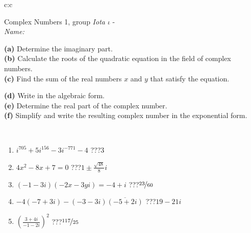 \documentclass[10pt]{report}
\begin{document}
\begin{tabular}{c:c}
\begin{minipage}[c][104.5mm][t]{0.5\linewidth}
\begin{center}
\vspace{5mm}
{\huge Complex Numbers 1, group \textit{Iota $\iota$} -}\\[5mm]
\textit{Name:}\phantom{xxxxxxxxxxxxxxxxxxxxxxxxxxxxxxxxxxxxxxxxxxxxxxxxxxxxxxxxxxxxxxxxx}\\[5mm]
\begin{minipage}{0.95\linewidth}
\begin{center}
{\small \begin{minipage}{0.44\textwidth} \raggedright
\textbf{(a)} Determine the imaginary part. \\[1mm]
\textbf{(b)} Calculate the roots of the quadratic equation in the field of complex numbers. \\[1mm]
\textbf{(c)} Find the sum of the real numbers \(x\) and \(y\) that satisfy the equation. \end{minipage} \begin{minipage}{0.54\textwidth}
\textbf{(d)} Write in the algebraic form. \\[1mm]
\textbf{(e)} Determine the real part of the complex number. \\[1mm]
\textbf{(f)} Simplify and write the resulting complex number in the exponential form.
\end{minipage}
} \vspace{3mm}
\end{center}
\end{minipage}
\\[1mm]
\begin{minipage}{0.79\linewidth}
\begin{center}
\begin{varwidth}{\linewidth}
\setlength{\itemsep}{0pt}
\begin{enumerate}
\large
\item $i^{705}+5i^{156}-3i^{-771}-4$\quad \dotfill\; ???\;\dotfill \quad $3$
\item $4x^2-8x+7=0$\quad \dotfill\; ???\;\dotfill \quad $1 \pm{}\frac{ \sqrt{48}}{8}i$
\item $(-1-3i)(-2x-3yi)=-4+i$\quad \dotfill\; ???\;\dotfill \quad $\nicefrac{23}{60}$
\item $-4(-7+3i)-(-3-3i)\overline{(-5+2i)}$\quad \dotfill\; ???\;\dotfill \quad $19-21i$
\item $\left(\frac{3+4i}{-1-2i}\right)^2$\quad \dotfill\; ???\;\dotfill \quad $\nicefrac{117}{25}$

\end{enumerate}
\end{varwidth}
\end{center}
\end{minipage}
\end{center}
\end{minipage}
\end{tabular}
\end{document}
